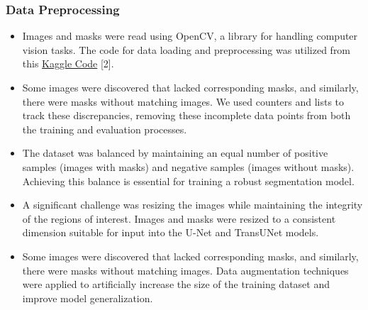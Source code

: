 \documentclass[11pt,a4paper]{article}
\begin{document}
\subsubsection{Data Preprocessing}
\begin{itemize}
    \item Images and masks were read using OpenCV, a library for handling computer vision tasks. The code for data loading and preprocessing was utilized from this \href{https://www.kaggle.com/code/arham23/brain-mri-segmentation-eda-and-unet-unet-results/notebook}{Kaggle Code} [2].
    \item Some images were discovered that lacked corresponding masks, and similarly, there were masks without matching images. We used counters and lists to track these discrepancies, removing these incomplete data points from both the training and evaluation processes.
    \item The dataset was balanced by maintaining an equal number of positive samples (images with masks) and negative samples (images without masks). Achieving this balance is essential for training a robust segmentation model.
    \item A significant challenge was resizing the images while maintaining the integrity of the regions of interest. Images and masks were resized to a consistent dimension suitable for input into the U-Net and TransUNet models.
    \item Some images were discovered that lacked corresponding masks, and similarly, there were masks without matching images. Data augmentation techniques were applied to artificially increase the size of the training dataset and improve model generalization. 
\end{itemize}
\end{document}
